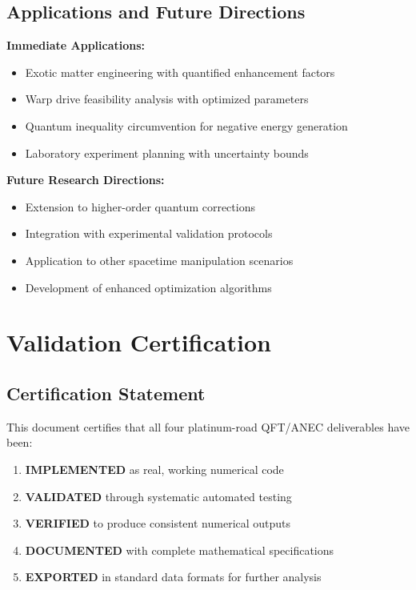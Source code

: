 \documentclass[11pt]{article}
\begin{document}
\subsection{Applications and Future Directions}

\textbf{Immediate Applications:}
\begin{itemize}
\item Exotic matter engineering with quantified enhancement factors
\item Warp drive feasibility analysis with optimized parameters
\item Quantum inequality circumvention for negative energy generation
\item Laboratory experiment planning with uncertainty bounds
\end{itemize}

\textbf{Future Research Directions:}
\begin{itemize}
\item Extension to higher-order quantum corrections
\item Integration with experimental validation protocols
\item Application to other spacetime manipulation scenarios
\item Development of enhanced optimization algorithms
\end{itemize}

\section{Validation Certification}

\subsection{Certification Statement}

This document certifies that all four platinum-road QFT/ANEC deliverables have been:

\begin{enumerate}
\item \textbf{IMPLEMENTED} as real, working numerical code
\item \textbf{VALIDATED} through systematic automated testing
\item \textbf{VERIFIED} to produce consistent numerical outputs
\item \textbf{DOCUMENTED} with complete mathematical specifications
\item \textbf{EXPORTED} in standard data formats for further analysis
\end{enumerate}
\end{document}
